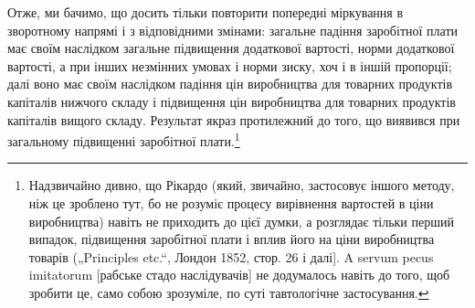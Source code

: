 Отже, ми бачимо, що досить тільки повторити попередні міркування в зворотному напрямі і з
відповідними змінами: загальне падіння заробітної плати має своїм наслідком загальне підвищення
додаткової вартості, норми додаткової вартості, а при інших незмінних умовах і норми зиску, хоч і в
іншій пропорції; далі воно має своїм наслідком падіння цін виробництва для товарних продуктів
капіталів нижчого складу і підвищення цін виробництва для товарних продуктів капіталів вищого
складу. Результат якраз протилежний до того, що  виявився при загальному підвищенні заробітної
плати.\footnote{
Надзвичайно дивно, що Рікардо (який, звичайно, застосовує іншого
методу, ніж це зроблено тут, бо не розуміє процесу вирівнення вартостей в ціни виробництва) навіть
не приходить до цієї думки, а розглядає тільки перший випадок, підвищення заробітної плати і вплив
його на ціни виробництва товарів („Principles etc.“, Лондон 1852, стор. 26 і далі]. A servum pecus
imitatorum [рабське стадо наслідувачів] не додумалось навіть до того, щоб зробити
це, само собою зрозуміле, по суті тавтологічне застосування.
}
\parbreak{}  %
